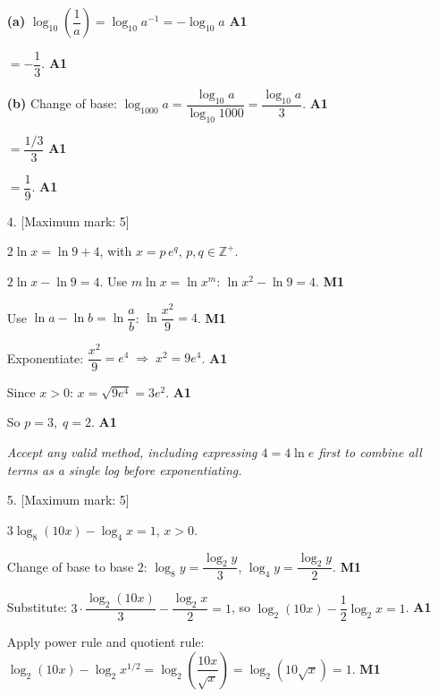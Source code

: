 \documentclass[12pt, twoside]{article}
\begin{document}
\begin{enumerate}[itemsep=0.3cm]
\textbf{(a)} $\log_{10}\!\left(\dfrac{1}{a}\right)
= \log_{10} a^{-1} = -\log_{10} a$ \hfill \textbf{A1}

$= -\dfrac{1}{3}$. \hfill \textbf{A1}

\medskip

\textbf{(b)} Change of base:
$\log_{1000} a = \dfrac{\log_{10} a}{\log_{10} 1000} = \dfrac{\log_{10} a}{3}$. \hfill \textbf{A1}

$= \dfrac{1/3}{3}$ \hfill \textbf{A1}

$= \dfrac{1}{9}$. \hfill \textbf{A1}

\newpage

\item[4.] [Maximum mark: 5]

$2\ln x = \ln 9 + 4$, with $x = p\, e^{q}$, $p, q \in \mathbb{Z}^{+}$.

\medskip

$2\ln x - \ln 9 = 4$. \;Use $m\ln x = \ln x^{m}$: \;$\ln x^{2} - \ln 9 = 4$.
\hfill \textbf{M1}

Use $\ln a - \ln b = \ln\dfrac{a}{b}$:
$\ln\dfrac{x^{2}}{9} = 4$. \hfill \textbf{M1}

Exponentiate:
$\dfrac{x^{2}}{9} = e^{4} \;\Rightarrow\; x^{2} = 9e^{4}$. \hfill \textbf{A1}

Since $x > 0$:
$x = \sqrt{9e^{4}} = 3e^{2}$. \hfill \textbf{A1}

So $p = 3, \; q = 2$. \hfill \textbf{A1}

\emph{Accept any valid method, including expressing $4 = 4\ln e$ first
to combine all terms as a single log before exponentiating.}

\newpage

\item[5.] [Maximum mark: 5]

$3\log_{8}(10x) - \log_{4} x = 1$, \;$x > 0$.

\medskip

Change of base to base $2$: \;$\log_{8} y = \dfrac{\log_{2} y}{3}$, \;
$\log_{4} y = \dfrac{\log_{2} y}{2}$. \hfill \textbf{M1}

Substitute:
$3 \cdot \dfrac{\log_{2}(10x)}{3} - \dfrac{\log_{2} x}{2} = 1$,
\;so $\log_{2}(10x) - \dfrac{1}{2}\log_{2} x = 1$. \hfill \textbf{A1}

Apply power rule and quotient rule:
$\log_{2}(10x) - \log_{2} x^{1/2} = \log_{2}\!\left(\dfrac{10x}{\sqrt{x}}\right)
= \log_{2}(10\sqrt{x}) = 1$. \hfill \textbf{M1}


\end{enumerate}
\end{document}
